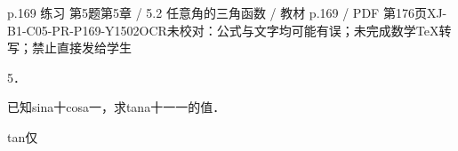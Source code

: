\begin{bankitem}{p.169 练习 第5题}{第5章 / 5.2 任意角的三角函数 / 教材 p.169 / PDF 第176页}{XJ-B1-C05-PR-P169-Y1502}{OCR未校对：公式与文字均可能有误；未完成数学TeX转写；禁止直接发给学生}
\begin{ocrdraft}
\par
5．
\par
已知sina十cosa一，求tana十一一的值．
\par
tan仅
\end{ocrdraft}
\end{bankitem}
